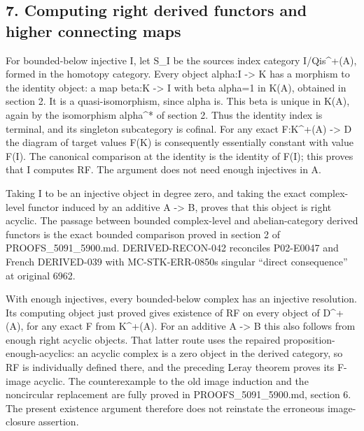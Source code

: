 \subsection{7. Computing right derived functors and higher connecting maps}\label{proofs-6209-7089-computing-right-derived-functors-and-higher-connecting-maps}

For bounded-below injective I,\allowbreak{} let S\_\allowbreak{}I be the source\textquotesingle s index category I/\allowbreak{}Qis\textasciicircum{}\allowbreak{}+(A)\allowbreak{},\allowbreak{} formed in the homotopy category. Every object alpha:\allowbreak{}I \allowbreak{}-> K has a morphism to the identity object:\allowbreak{} a map beta:\allowbreak{}K \allowbreak{}-> I with beta alpha\allowbreak{}=1 in K(A)\allowbreak{},\allowbreak{} obtained in section 2. It is a quasi-isomorphism,\allowbreak{} since alpha is. This beta is unique in K(A)\allowbreak{},\allowbreak{} again by the isomorphism alpha\^{}* of section 2. Thus the identity index is terminal,\allowbreak{} and its singleton subcategory is cofinal. For any exact F:\allowbreak{}K\textasciicircum{}\allowbreak{}+(A)\allowbreak{} \allowbreak{}-> D the diagram of target values F(K)\allowbreak{} is consequently essentially constant with value F(I)\allowbreak{}. The canonical comparison at the identity is the identity of F(I)\allowbreak{}; this proves that I computes RF. The argument does not need enough injectives in A.

Taking I to be an injective object in degree zero,\allowbreak{} and taking the exact complex-level functor induced by an additive A \allowbreak{}-> B,\allowbreak{} proves that this object is right acyclic. The passage between bounded complex-level and abelian-category derived functors is the exact bounded comparison proved in section 2 of PROOFS\_\allowbreak{}5091\_\allowbreak{}5900.md. DERIVED-RECON-042 reconciles P02-E0047 and French DERIVED-039 with MC-STK-ERR-0850\textquotesingle s singular ``direct consequence'' at original 6962.

With enough injectives,\allowbreak{} every bounded-below complex has an injective resolution. Its computing object just proved gives existence of RF on every object of D\textasciicircum{}\allowbreak{}+(A)\allowbreak{},\allowbreak{} for any exact F from K\textasciicircum{}\allowbreak{}+(A)\allowbreak{}. For an additive A \allowbreak{}-> B this also follows from enough right acyclic objects. That latter route uses the repaired proposition-enough-acyclics:\allowbreak{} an acyclic complex is a zero object in the derived category,\allowbreak{} so RF is individually defined there,\allowbreak{} and the preceding Leray theorem proves its F-image acyclic. The counterexample to the old image induction and the noncircular replacement are fully proved in PROOFS\_\allowbreak{}5091\_\allowbreak{}5900.md,\allowbreak{} section 6. The present existence argument therefore does not reinstate the erroneous image-closure assertion.

